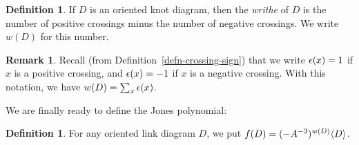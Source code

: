 \documentclass[reqno]{amsart}
\theoremstyle{definition}
\newtheorem{remark}[theorem]{Remark}
\newtheorem{definition}[theorem]{Definition}
\begin{document}
\begin{definition}\label{defn-writhe}
 If $D$ is an oriented knot diagram, then the \emph{writhe} of $D$ is
 the number of positive crossings minus the number of negative
 crossings.  We write $w(D)$ for this number.
\end{definition}

\begin{remark}\label{rem-writhe}
 Recall (from Definition~\ref{defn-crossing-sign}) that we write
 $\epsilon(x)=1$ if $x$ is a positive crossing, and $\epsilon(x)=-1$ if $x$ is a
 negative crossing.  With this notation, we have $w(D)=\sum_x\epsilon(x)$.
\end{remark}

We are finally ready to define the Jones polynomial:
\begin{definition}
 For any oriented link diagram $D$, we put $f(D)=(-A^{-3})^{w(D)}\langle D\rangle$.
\end{definition}
\end{document}
